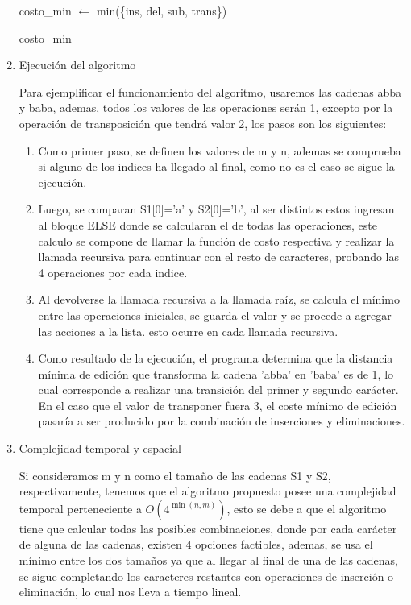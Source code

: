 \begin{enumerate}[1)]
\begin{algorithm}[H]
{        costo\_min $\leftarrow$ min(\{ins, del, sub, trans\})\;
    
        \Return costo\_min\;
    }


\end{algorithm}

\item Ejecución del algoritmo

Para ejemplificar el funcionamiento del algoritmo, usaremos las cadenas
abba y baba, ademas, todos los valores de las operaciones serán 1, excepto
por la operación de transposición que tendrá valor 2, los pasos son los siguientes:


\begin{enumerate}[1)]
    \item Como primer paso, se definen los valores de m y n, ademas se comprueba si alguno de los 
indices ha llegado al final, como no es el caso se sigue la ejecución.

\item Luego, se comparan S1[0]='a' y S2[0]='b', al ser distintos estos ingresan al bloque ELSE 
donde se calcularan el de todas las operaciones, este calculo se compone de llamar la función de costo 
respectiva y realizar la llamada recursiva para continuar con el resto de caracteres, 
probando las 4 operaciones por cada indice.

\item Al devolverse la llamada recursiva a la llamada raíz, se calcula el mínimo
entre las operaciones iniciales, se guarda el valor y se procede a agregar las
acciones a la lista. esto ocurre en cada llamada recursiva.

\item Como resultado de la ejecución, el programa determina que la distancia mínima de edición
que transforma la cadena 'abba' en 'baba' es de 1, lo cual corresponde a realizar una
transición del primer y segundo carácter. En el caso que el valor de transponer fuera 3, el coste mínimo de edición
pasaría a ser producido por la combinación de inserciones y eliminaciones.


\end{enumerate}

\item Complejidad temporal y espacial

Si consideramos m y n como el tamaño de las cadenas S1 y S2, 
respectivamente, tenemos que
el algoritmo propuesto posee una complejidad temporal 
perteneciente a $O\left(4^{\min(n, m)}\right)$, esto
se debe a que el algoritmo tiene que calcular todas las posibles
combinaciones, donde por cada carácter de alguna de las cadenas, existen
4 opciones factibles, ademas, se usa el mínimo entre los dos tamaños ya que
al llegar al final de una de las cadenas, se sigue completando los caracteres
restantes con operaciones de inserción o eliminación, 
lo cual nos lleva a tiempo lineal.


\end{enumerate}
